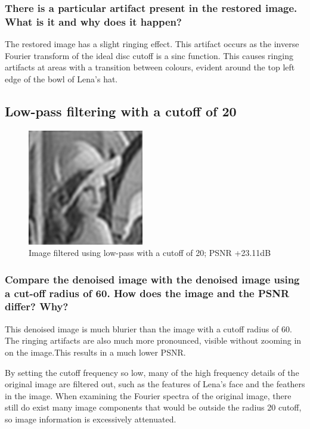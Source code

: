 \documentclass[article, 1.5space, letterpaper, 12pt, oneside, header, footer]{SydeClass}
\begin{document}
\subsubsection{There is a particular artifact present in the restored image. What is it and why does it happen?}

The restored image has a slight ringing effect. This artifact occurs as the inverse Fourier transform of the ideal disc cutoff is a sinc function. This causes ringing artifacts at areas with a transition between colours, evident around the top left edge of the bowl of Lena's hat.

\subsection{Low-pass filtering with a cutoff of 20}
\begin{figure}[ht]
\centering
	\includegraphics[width=0.45\textwidth]{question5/3_lena_LFP_20}
	\caption{Image filtered using low-pass with a cutoff of 20; PSNR +23.11dB}
\end{figure}

\subsubsection{Compare the denoised image with the denoised image using a cut-off radius of 60. How does the
image and the PSNR differ? Why?}

This denoised image is much blurier than the image with a cutoff radius of 60. The ringing artifacts are also much more pronounced, visible without zooming in on the image.This results in a much lower PSNR. 

By setting the cutoff frequency so low, many of the high frequency details of the original image are filtered out, such as the features of Lena's face and the feathers in the image. When examining the Fourier spectra of the original image, there still do exist many image components that would be outside the radius 20 cutoff, so image information is excessively attenuated.
\end{document}
